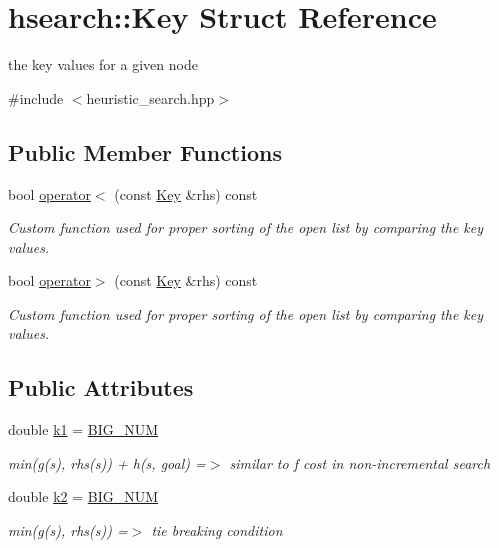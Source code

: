 \hypertarget{structhsearch_1_1Key}{}\section{hsearch\+:\+:Key Struct Reference}
\label{structhsearch_1_1Key}


the key values for a given node  




{\ttfamily \#include $<$heuristic\+\_\+search.\+hpp$>$}

\subsection*{Public Member Functions}
\begin{DoxyCompactItemize}
\item 
bool \hyperlink{structhsearch_1_1Key_a869b0689bb15fdd6e5578f9d4fc466a6}{operator$<$} (const \hyperlink{structhsearch_1_1Key}{Key} \&rhs) const
\begin{DoxyCompactList}\small\item\em Custom function used for proper sorting of the open list by comparing the key values. \end{DoxyCompactList}\item 
bool \hyperlink{structhsearch_1_1Key_a14fb1a53446fb9be30c4d8d584406511}{operator$>$} (const \hyperlink{structhsearch_1_1Key}{Key} \&rhs) const
\begin{DoxyCompactList}\small\item\em Custom function used for proper sorting of the open list by comparing the key values. \end{DoxyCompactList}\end{DoxyCompactItemize}
\subsection*{Public Attributes}
\begin{DoxyCompactItemize}
\item 
\mbox{\label{structhsearch_1_1Key_a25799f303c869b7406796f08d0db924a}} 
double \hyperlink{structhsearch_1_1Key_a25799f303c869b7406796f08d0db924a}{k1} = \hyperlink{potential__fields_8hpp_a44b8ad40964aabfb40ae3a0625190475}{B\+I\+G\+\_\+\+N\+UM}
\begin{DoxyCompactList}\small\item\em min(g(s), rhs(s)) + h(s, goal) =$>$ similar to f cost in non-\/incremental search \end{DoxyCompactList}\item 
\mbox{\label{structhsearch_1_1Key_ad759545484e29eaaf8d462852e4f9de5}} 
double \hyperlink{structhsearch_1_1Key_ad759545484e29eaaf8d462852e4f9de5}{k2} = \hyperlink{potential__fields_8hpp_a44b8ad40964aabfb40ae3a0625190475}{B\+I\+G\+\_\+\+N\+UM}
\begin{DoxyCompactList}\small\item\em min(g(s), rhs(s)) =$>$ tie breaking condition \end{DoxyCompactList}\end{DoxyCompactItemize}


